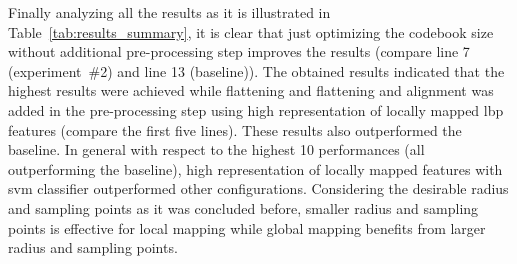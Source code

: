Finally analyzing all the results as it is illustrated in Table~\ref{tab:results_summary}, it is clear that just optimizing the codebook size without additional pre-processing step improves the results (compare line 7 (experiment~\#2) and line 13 (baseline)).
The obtained results indicated that the highest results were achieved while flattening and flattening and alignment was added in the pre-processing step using high representation of locally mapped \ac{lbp} features (compare the first five lines).
These results also outperformed the baseline.
In general with respect to the highest 10 performances (all outperforming the baseline), high representation of locally mapped features with \ac{svm} classifier outperformed other configurations.
Considering the desirable radius and sampling points as it was concluded before, smaller radius and sampling points is effective for local mapping while global mapping benefits from larger radius and sampling points.